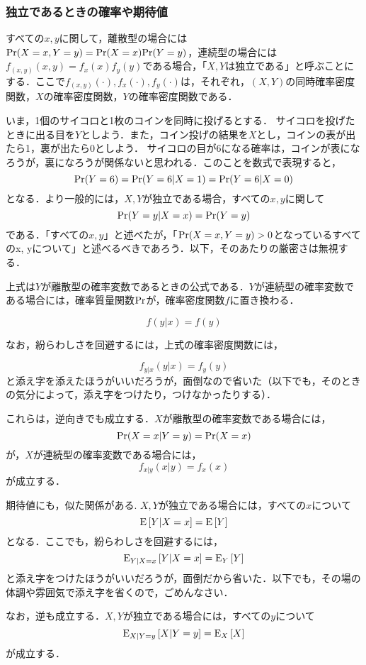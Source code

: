\documentclass[12pt]{jsarticle}
\begin{document}
\subsubsection{独立であるときの確率や期待値}\label{sec:indexp}

すべての$x, y$に関して，離散型の場合には${\rm Pr}(X = x, Y =y) = {\rm Pr}(X = x){\rm Pr}(Y = y)$，連続型の場合には$f_{(x,y)}(x, y)=f_x(x)f_y(y)$である場合，「$X, Y$は独立である」と呼ぶことにする．ここで$f_{(x,y)}(\cdot), f_{x}(\cdot), f_{y}(\cdot)$は，それぞれ，$(X,Y)$の同時確率密度関数，$X$の確率密度関数，$Y$の確率密度関数である．

いま，1個のサイコロと1枚のコインを同時に投げるとする．
サイコロを投げたときに出る目を$Y$としよう．また，コイン投げの結果を$X$とし，コインの表が出たら1，裏が出たら0としよう．
サイコロの目が6になる確率は，コインが表になろうが，裏になろうが関係ないと思われる．このことを数式で表現すると，
\[
{\rm Pr}(Y=6) = {\rm Pr}(Y=6|X=1) = {\rm Pr}(Y=6|X=0)
\]
となる．より一般的には，$X, Y$が独立である場合，すべての$x,y$に関して
\[
{\rm Pr}(Y = y|X =x) = {\rm Pr}(Y = y)
\]
である．「すべての$x,y$」と述べたが，「${\rm Pr}(X=x, Y=y)>0$となっているすべてのx, yについて」と述べるべきであろう．以下，そのあたりの厳密さは無視する．


上式は$Y$が離散型の確率変数であるときの公式である．$Y$が連続型の確率変数である場合には，確率質量関数${\rm Pr}$が，確率密度関数$f$に置き換わる．

\[
f(y|x) = f(y)
\]

なお，紛らわしさを回避するには，上式の確率密度関数には，

\[
f_{y|x}(y|x) = f_y(y)
\]
と添え字を添えたほうがいいだろうが，面倒なので省いた（以下でも，そのときの気分によって，添え字をつけたり，つけなかったりする）．

これらは，逆向きでも成立する．$X$が離散型の確率変数である場合には，
\[
{\rm Pr}(X = x|Y =y) = {\rm Pr}(X = x)
\]
が，$X$が連続型の確率変数である場合には，
\[
f_{x|y}(x|y) = f_x(x)
\]
が成立する．




期待値にも，似た関係がある. $X, Y$が独立である場合には，すべての$x$について
\[
{\rm E}\left[Y|X=x\right] = {\rm E}\left[Y\right]
\]
となる．ここでも，紛らわしさを回避するには，
\[
{\rm E}_{Y|X=x}\left[Y|X=x\right] = {\rm E}_Y\left[Y\right]
\]
と添え字をつけたほうがいいだろうが，面倒だから省いた．以下でも，その場の体調や雰囲気で添え字を省くので，ごめんなさい．

なお，逆も成立する．$X, Y$が独立である場合には，すべての$y$について
\[
{\rm E}_{X|Y=y}\left[X|Y=y\right] = {\rm E}_X\left[X\right]
\]
が成立する．
\end{document}
